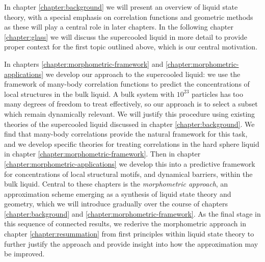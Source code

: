\documentclass[11pt,twoside]{report}
\begin{document}
In chapter \ref{chapter:background} we will present an overview of liquid state theory, with a special emphasis on correlation functions and geometric methods as these will play a central role in later chapters.
In the following chapter \ref{chapter:glass} we will discuss the supercooled liquid in more detail to provide proper context for the first topic outlined above, which is our central motivation.

In chapters \ref{chapter:morphometric-framework} and \ref{chapter:morphometric-applications} we develop our approach to the supercooled liquid: we use the framework of many-body correlation functions to predict the concentrations of local structures in the bulk liquid.
A bulk system with $10^{23}$ particles has too many degrees of freedom to treat effectively, so our approach is to select a subset which remain dynamically relevant.
We will justify this procedure using existing theories of the supercooled liquid discussed in chapter \ref{chapter:background}.
We find that many-body correlations provide the natural framework for this task, and we develop specific theories for treating correlations in the hard sphere liquid in chapter \ref{chapter:morphometric-framework}.
Then in chapter \ref{chapter:morphometric-applications} we develop this into a predictive framework for concentrations of local structural motifs, and dynamical barriers, within the bulk liquid.
Central to these chapters is the \emph{morphometric approach}, an approximation scheme emerging as a synthesis of liquid state theory and geometry, which we will introduce gradually over the course of chapters \ref{chapter:background} and \ref{chapter:morphometric-framework}.
As the final stage in this sequence of connected results, we rederive the morphometric approach in chapter \ref{chapter:resummation} from first principles within liquid state theory to further justify the approach and provide insight into how the approximation may be improved.
\end{document}
